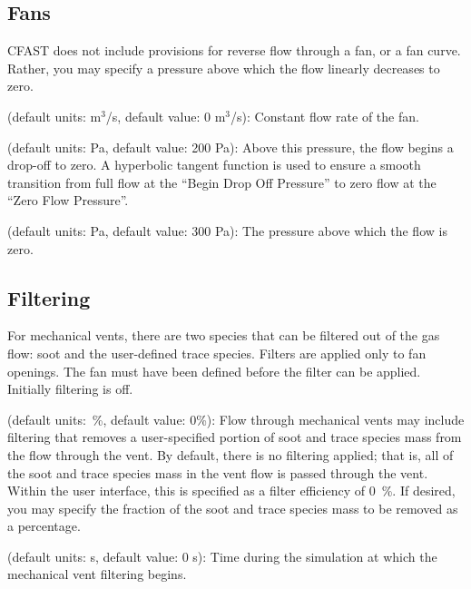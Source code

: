 \subsection{Fans}
\label{info:VENT4}
CFAST does not include provisions for reverse flow through a fan, or a fan curve. Rather, you may specify a pressure above which the flow linearly decreases to zero.
\begin{description}
\label{Mech Flow Rate}
\item[Flow Rate] (default units: m$^3$/s, default value: 0 m$^3$/s): Constant flow rate of the fan.
\label{Mech Begin Drop Off Pressure}
\item[Begin Drop Off Pressure] (default units: Pa, default value: 200 Pa): Above this pressure, the flow begins a drop-off to zero. A hyperbolic tangent function is used to ensure a smooth transition from full flow at the ``Begin Drop Off Pressure'' to zero flow at the ``Zero Flow Pressure''.
\label{Mech Zero Flow Pressure}
\item[Zero Flow Pressure] (default units: Pa, default value: 300 Pa): The pressure above which the flow is zero.
\end{description}




\subsection{Filtering}
\label{info:VENT5}
For mechanical vents, there are two species that can be filtered out of the gas flow: soot and the user-defined trace species. Filters are applied only to fan openings. The fan must have been defined before the filter can be applied. Initially filtering is off.
\begin{description}
\label{Mech Filter Efficiency}
\item[Filter Efficiency] (default units:~\%, default value: 0\%): Flow through mechanical vents may include filtering that removes a user-specified portion of soot and trace species mass from the flow through the vent.  By default, there is no filtering applied; that is, all of the soot and trace species mass in the vent flow is passed through the vent. Within the user interface, this is specified as a filter efficiency of 0~\%.  If desired, you may specify the fraction of the soot and trace species mass to be removed as a percentage.
\label{Mech Begin Filtering At Time}
\item[Begin Filtering At Time] (default units: s, default value: 0 s): Time during the simulation at which the mechanical vent filtering begins.
\end{description}

